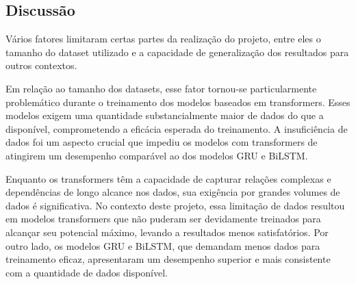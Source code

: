 \documentclass[conference]{IEEEtran}
\begin{document}
\subsection{Discussão}

Vários fatores limitaram certas partes da realização do projeto, entre eles o tamanho do dataset utilizado e a capacidade de generalização dos resultados para outros contextos.

Em relação ao tamanho dos datasets, esse fator tornou-se particularmente problemático durante o treinamento dos modelos baseados em transformers. Esses modelos exigem uma quantidade substancialmente maior de dados do que a disponível, comprometendo a eficácia esperada do treinamento. A insuficiência de dados foi um aspecto crucial que impediu os modelos com transformers de atingirem um desempenho comparável ao dos modelos GRU e BiLSTM.

Enquanto os transformers têm a capacidade de capturar relações complexas e dependências de longo alcance nos dados, sua exigência por grandes volumes de dados é significativa. No contexto deste projeto, essa limitação de dados resultou em modelos transformers que não puderam ser devidamente treinados para alcançar seu potencial máximo, levando a resultados menos satisfatórios. Por outro lado, os modelos GRU e BiLSTM, que demandam menos dados para treinamento eficaz, apresentaram um desempenho superior e mais consistente com a quantidade de dados disponível.



\end{document}
